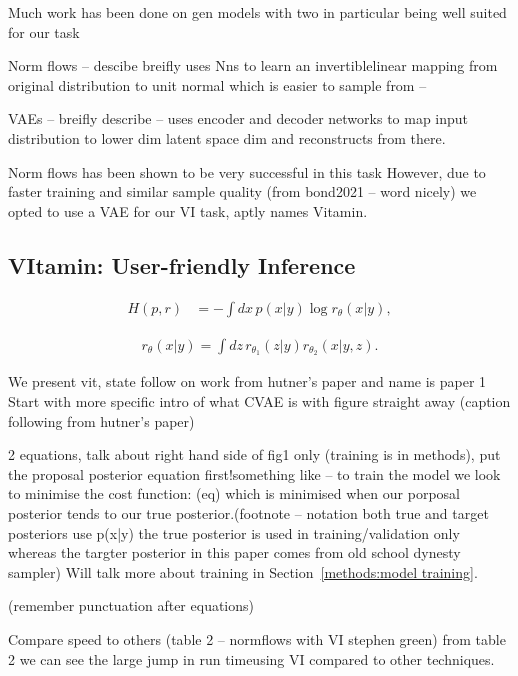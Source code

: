 \documentclass[aps,superscriptaddress,twocolumn,nopreprintnumbers,floatfix,groupedaddress]{revtex4-1}
\newcommand{\vitamin}{{\sc VItamin}\xspace}
\begin{document}
Much work has been done on gen models with two in particular being well suited for our task

Norm flows – descibe breifly uses Nns to learn an invertiblelinear mapping from original distribution to unit normal which is easier to sample from – 

VAEs – breifly describe – uses encoder and decoder networks to map input distribution to lower dim latent space dim and reconstructs from there.

Norm flows has been shown to be very successful in this task \cite{williams2021nested,stephengreen2020,papamakarios2019normalizing} However, due to faster training and similar sample quality (from bond2021 – word nicely) we opted to use a VAE for our VI task, aptly names Vitamin.

%
\subsection{\vitamin: User-friendly Inference}\label{vit}
%
\begin{align}\label{eq:cross_ent} 
H(p,r) &= -\int dx\, p(x|y) \log r_{\theta}(x|y),
\end{align}

\begin{align}\label{eq:prop_post}
r_{\theta}(x|y) = \int dz\,r_{\theta_1}(z|y)r_{\theta_2}(x|y,z).
\end{align}

We present vit, state follow on work from hutner’s paper and name is paper 1
Start with more specific intro of what CVAE is with figure straight away (caption following from hutner’s paper)

2 equations, talk about right hand side of fig1 only (training is in methods), put the proposal posterior equation first!something like – to train the model we look to minimise the cost function: (eq) which is minimised when our porposal posterior tends to our true posterior.(footnote – notation both true and target posteriors use p(x|y) the true posterior is used in training/validation only whereas the targter posterior in this paper comes from old school dynesty sampler) Will talk more about training in Section~\ref{methods:model training}.

(remember punctuation after equations)

Compare speed to others (table 2 – normflows with VI stephen green) from table 2 we can see the large jump in run timeusing VI compared to other techniques. 
\end{document}
